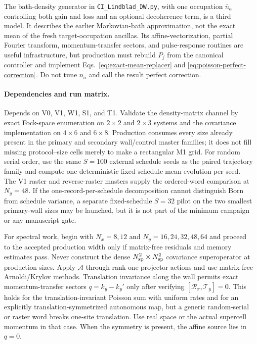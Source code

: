 \documentclass[aps,prx,onecolumn,nofootinbib,superscriptaddress,longbibliography]{revtex4-2}
\newcommand{\code}[1]{\texttt{#1}}
\begin{document}
The bath-density generator in \code{CI\_Lindblad\_DW.py}, with one occupation
$\bar n_a$ controlling both gain and loss and an optional decoherence term, is a third
model.  It describes the earlier Markovian-bath approximation, not the exact mean of the
fresh target-occupation ancillas.  Its affine-vectorization, partial Fourier transform,
momentum-transfer sectors, and pulse-response routines are useful infrastructure, but
production must rebuild $P_j$ from the canonical controller and implement
Eqs.~\eqref{eq:exact-mean-replacer} and \eqref{eq:poisson-perfect-correction}.  Do not tune
$\bar n_a$ and call the result perfect correction.

\paragraph{Dependencies and run matrix.}
Depends on V0, V1, W1, S1, and T1.  Validate the density-matrix channel by exact Fock-space
enumeration on $2\times2$ and $2\times3$ systems and the covariance implementation on
$4\times6$ and $6\times8$.  Production consumes every size already present in the primary
and secondary wall/control master families; it does not fill missing protocol--size cells
merely to make a rectangular M1 grid.  For random serial order, use the same $S=100$
external schedule seeds as the paired trajectory family and compute one deterministic
fixed-schedule mean evolution per seed.  The V1 raster and reverse-raster masters supply
the ordered-word comparison at $N_y=48$.  If the one-record-per-schedule decomposition
cannot distinguish Born from schedule variance, a separate fixed-schedule $S=32$ pilot on
the two smallest primary-wall sizes may be launched, but it is not part of the minimum
campaign or any manuscript gate.

For spectral work, begin with $N_x=8,12$ and $N_y=16,24,32,48,64$ and proceed to the
accepted production width only if matrix-free residuals and memory estimates pass.
Never construct the dense $N_{\rm sp}^2\times N_{\rm sp}^2$ covariance superoperator at
production sizes.  Apply $\mathcal A$ through rank-one projector actions and use
matrix-free Arnoldi/Krylov methods.  Translation invariance along the wall permits exact
momentum-transfer sectors $q=k_y-k_y'$ only after verifying
$[\mathcal R_\pi,\mathcal T_y]=0$.  This holds for the translation-invariant Poisson sum
with uniform rates and for an explicitly translation-symmetrized autonomous map, but a
generic random-serial or raster word breaks one-site translation.  Use real space or the actual
supercell momentum in that case.  When the symmetry is present, the affine source lies in
$q=0$.
\end{document}
